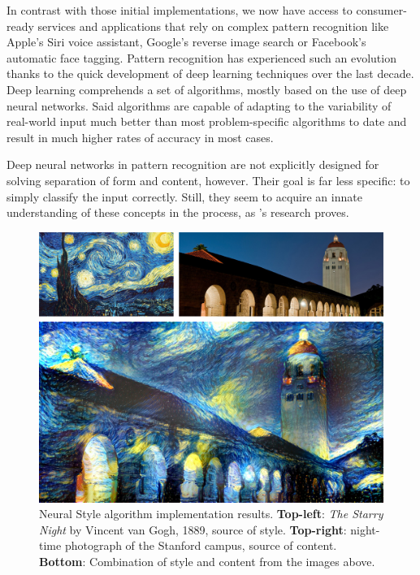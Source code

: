 In contrast with those initial implementations, we now have access to consumer-ready services and applications that rely on complex pattern recognition like Apple's Siri voice assistant, Google's reverse image search or Facebook's automatic face tagging.
Pattern recognition has experienced such an evolution thanks to the quick development of deep learning techniques over the last decade.
Deep learning comprehends a set of algorithms, mostly based on the use of deep neural networks.
Said algorithms are capable of adapting to the variability of real-world input much better than most problem-specific algorithms to date and result in much higher rates of accuracy in most cases.

Deep neural networks in pattern recognition are not explicitly designed for solving separation of form and content, however.
Their goal is far less specific: to simply classify the input correctly.
Still, they seem to acquire an innate understanding of these concepts in the process, as \citeauthor{Gatys2015B}'s research \cite{Gatys2015B} proves.

\begin{figure}[htb]
  \includegraphics[width=\textwidth]{gfx/neural-style-composed}
  \caption{
    Neural Style algorithm implementation \cite{Johnson2015} results.
    \textbf{Top-left}: \textit{The Starry Night} by Vincent van Gogh, 1889, source of style.
    \textbf{Top-right}: night-time photograph of the Stanford campus, source of content.
    \textbf{Bottom}: Combination of style and content from the images above.
  }
  \label{fig:sec:intro:neural-style}
\end{figure}

